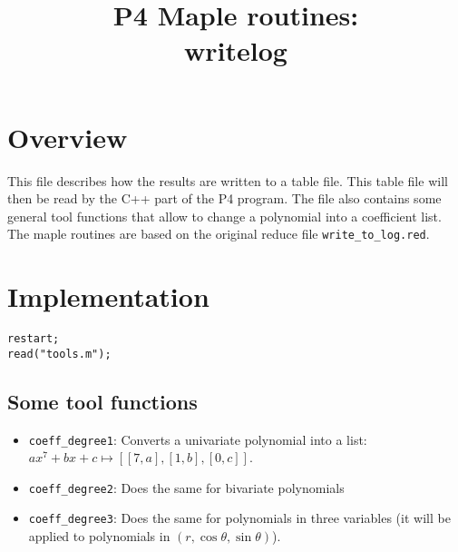 \documentclass[a4paper,10pt]{article}
\title{P4 Maple routines:\\writelog}
\author{}
\date{}
\begin{document}
\maketitle

\section{Overview}

This file describes how the results are written to a table file.  This table file will then
be read by the C++ part of the P4 program. The file also contains some general tool functions
that allow to change a polynomial into a coefficient list.
The maple routines are based on the original reduce file \verb+write_to_log.red+.

\section{Implementation}

\begin{lstlisting}[name=writelog]
restart;
read("tools.m");
\end{lstlisting}

\subsection{Some tool functions}

\begin{itemize}
\item \verb+coeff_degree1+:  Converts a univariate polynomial into a list: $ax^7+bx+c\mapsto [[7,a],[1,b],[0,c]]$.
\item \verb+coeff_degree2+:  Does the same for bivariate polynomials
\item \verb+coeff_degree3+:  Does the same for polynomials in three variables (it will be applied to polynomials
                                in $(r,\cos\theta,\sin\theta)$).
\end{itemize}
\end{document}
